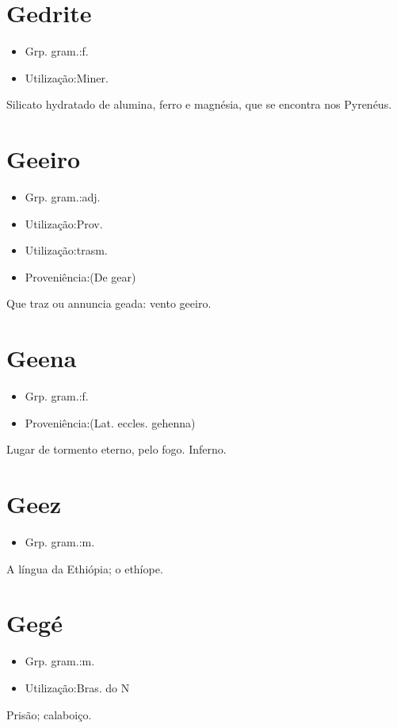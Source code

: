 \section{Gedrite}
\begin{itemize}
\item {Grp. gram.:f.}
\end{itemize}
\begin{itemize}
\item {Utilização:Miner.}
\end{itemize}
Silicato hydratado de alumina, ferro e magnésia, que se encontra nos Pyrenéus.
\section{Geeiro}
\begin{itemize}
\item {Grp. gram.:adj.}
\end{itemize}
\begin{itemize}
\item {Utilização:Prov.}
\end{itemize}
\begin{itemize}
\item {Utilização:trasm.}
\end{itemize}
\begin{itemize}
\item {Proveniência:(De \textunderscore gear\textunderscore )}
\end{itemize}
Que traz ou annuncia geada: \textunderscore vento geeiro\textunderscore .
\section{Geena}
\begin{itemize}
\item {Grp. gram.:f.}
\end{itemize}
\begin{itemize}
\item {Proveniência:(Lat. eccles. \textunderscore gehenna\textunderscore )}
\end{itemize}
Lugar de tormento eterno, pelo fogo.
Inferno.
\section{Geez}
\begin{itemize}
\item {Grp. gram.:m.}
\end{itemize}
A língua da Ethiópia; o ethíope.
\section{Gegé}
\begin{itemize}
\item {Grp. gram.:m.}
\end{itemize}
\begin{itemize}
\item {Utilização:Bras. do N}
\end{itemize}
Prisão; calaboiço.
